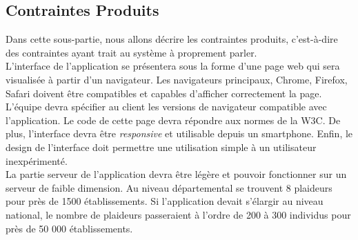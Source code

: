 \newpage
\subsection{Contraintes Produits}
Dans cette sous-partie, nous allons décrire les contraintes produits, c'est-à-dire des contraintes ayant trait au système à proprement parler.\\

L'interface de l'application se présentera sous la forme d'une page web qui sera visualisée à partir d'un navigateur. Les navigateurs principaux, Chrome, Firefox, Safari doivent être compatibles et capables d'afficher correctement la page. L'équipe \PIC{} devra spécifier au client les versions de navigateur compatible avec l'application.  Le code de cette page devra répondre aux normes de la W3C. De plus, l'interface devra être \emph{responsive} et utilisable depuis un smartphone. Enfin, le design de l'interface doit permettre une utilisation simple à un utilisateur inexpérimenté.\\

La partie serveur de l'application devra être légère et pouvoir fonctionner sur un serveur de faible dimension. Au niveau départemental se trouvent 8 plaideurs pour près de 1500 établissements. Si l'application devait s'élargir au niveau national, le nombre de plaideurs passeraient à l'ordre de 200 à 300 individus pour près de 50 000 établissements.\\
